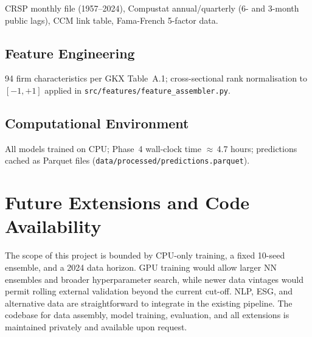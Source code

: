 \documentclass[11pt,a4paper]{article}
\begin{document}
\noindent\small CRSP monthly file (1957--2024), Compustat annual/quarterly (6- and 3-month public lags), CCM link table, Fama-French 5-factor data.

\subsection{Feature Engineering}

\noindent\small 94 firm characteristics per GKX Table~A.1; cross-sectional rank normalisation to $[-1,+1]$ applied in \texttt{src/features/feature\_assembler.py}.

\subsection{Computational Environment}

\noindent\small All models trained on CPU; Phase~4 wall-clock time $\approx$\,4.7 hours; predictions cached as Parquet files (\texttt{data/processed/predictions.parquet}).

\newpage



\bigskip
\section*{Future Extensions and Code Availability}

The scope of this project is bounded by CPU-only training, a fixed 10-seed ensemble, and a 2024 data horizon. GPU training would allow larger NN ensembles and broader hyperparameter search, while newer data vintages would permit rolling external validation beyond the current cut-off. NLP, ESG, and alternative data are straightforward to integrate in the existing pipeline. The codebase for data assembly, model training, evaluation, and all extensions is maintained privately and available upon request.

\end{document}

